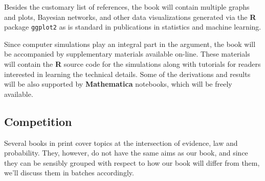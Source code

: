 \documentclass[
  10pt,
  dvipsnames,enabledeprecatedfontcommands]{scrartcl}
\begin{document}
\vspace{-2mm}

Besides the customary list of references, the book will contain multiple
graphs and plots, Bayesian networks, and other data visualizations
generated via the \textbf{\textsf{R}} package \texttt{ggplot2} as is
standard in publications in statistics and machine learning.

Since computer simulations play an integral part in the argument, the
book will be accompanied by supplementary materials available on-line.
These materials will contain the \textbf{\textsf{R}} source code for the
simulations along with tutorials for readers interested in learning the
technical details. Some of the derivations and results will be also
supported by \textbf{\textsf{Mathematica}} notebooks, which will be
freely available.

\hypertarget{competition}{%
\subsection{Competition}\label{competition}}

\normalsize

Several books in print cover topics at the intersection of evidence, law
and probability. They, however, do not have the same aims as our book,
and since they can be sensibly grouped with respect to how our book will
differ from them, we'll discuss them in batches accordingly.

\end{document}
